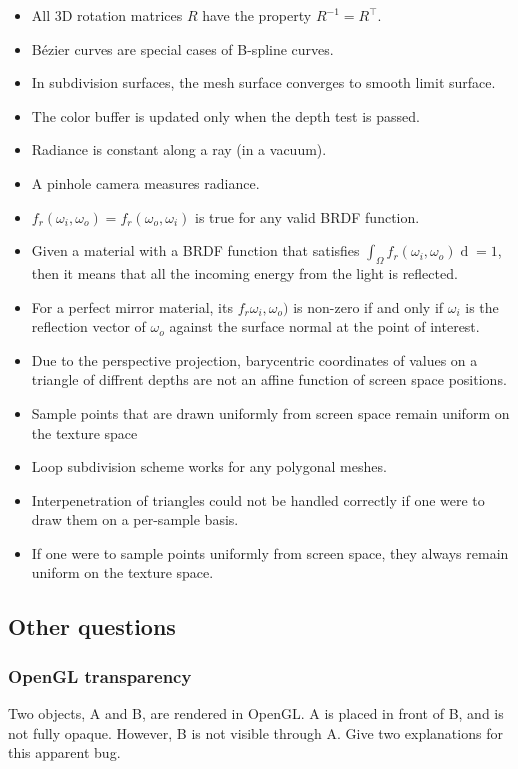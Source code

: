 \documentclass[a4paper,10pt]{article}
\newcommand{\cmark}{\text{\ding{51}}}
\newcommand{\xmark}{\text{\ding{55}}}
\begin{document}
\begin{itemize}
    \item[\cmark] All 3D rotation matrices \( R \) have the property \( R^{-1} = R^\top \).
    \item[\cmark] Bézier curves are special cases of B-spline curves.
    \item[\cmark] In subdivision surfaces, the mesh surface converges to smooth limit surface.
    \item[\cmark] The color buffer is updated only when the depth test is passed.
    \item[\cmark] Radiance is constant along a ray (in a vacuum).
    \item[\cmark] A pinhole camera measures radiance.
    \item[\cmark] \( f_r(\omega_i, \omega_o) = f_r(\omega_o, \omega_i) \) is true for any valid BRDF function.
    \item[\cmark] Given a material with a BRDF function that satisfies \( \int_\Omega f_r(\omega_i, \omega_o) \mathop{d\omega_i} = 1 \), then it means that all the incoming energy from the light is reflected.
    \item[\cmark] For a perfect mirror material, its \( f_r \omega _i, \omega _o) \) is non-zero if and only if \( \omega _i \) is the reflection vector of \( \omega _o \) against the surface normal at the point of interest.
    \item[\cmark] Due to the perspective projection, barycentric coordinates of values on a triangle of diffrent depths are not an affine function of screen space positions.
    \item[\xmark] Sample points that are drawn uniformly from screen space remain uniform on the texture space
    \item[\xmark] Loop subdivision scheme works for any polygonal meshes.
    \item[\xmark] Interpenetration of triangles could not be handled correctly if one were to draw them on a per-sample basis.
    \item[\xmark] If one were to sample points uniformly from screen space, they always remain uniform on the texture space.
\end{itemize}

\subsection{Other questions}
\subsubsection{OpenGL transparency}
Two objects, A and B, are rendered in OpenGL. A is placed in front of B, and is not fully opaque. However, B is not visible through A. Give two explanations for this apparent bug.
\end{document}
